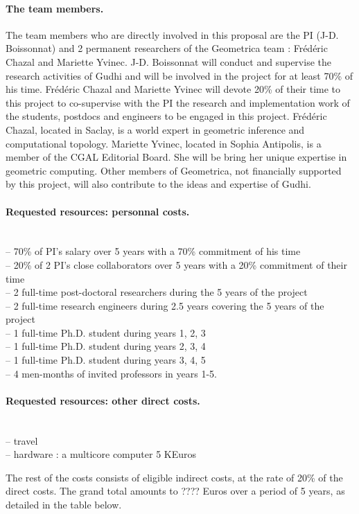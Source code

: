 \paragraph{The team members.}
The team members who are directly involved in this proposal are the PI (J-D. Boissonnat) and 2 permanent researchers of the Geometrica team : Fr\'ed\'eric Chazal and Mariette Yvinec.  J-D. Boissonnat will conduct and supervise the research activities of Gudhi and will be involved in the project for at least 70\% of his time.  Fr\'ed\'eric Chazal and Mariette Yvinec will devote 20\% of their time to this project to co-supervise with the PI the research and implementation work of the students, postdocs and engineers to be engaged in this project. Fr\'ed\'eric Chazal, located in Saclay,  is a world expert in geometric inference and computational topology. Mariette Yvinec, located in Sophia Antipolis,  is a member of the CGAL Editorial Board. She  will be bring her unique expertise in geometric computing. Other members of Geometrica, not financially supported by this project, will also contribute to the ideas and expertise of Gudhi.


\paragraph{Requested resources: personnal costs.}\mbox{}\\
-- 70\% of PI's salary over 5 years with a 70\% commitment of his time\\
-- 20\% of 2 PI's close collaborators over 5 years with a 20\% commitment of their time\\
-- 2 full-time post-doctoral researchers during the 5 years of the project\\
-- 2 full-time research engineers during 2.5 years covering the 5 years of the project\\
-- 1 full-time Ph.D. student during years 1, 2, 3\\
-- 1 full-time Ph.D. student during years 2, 3, 4\\
-- 1 full-time Ph.D. student during years 3, 4, 5\\
-- 4 men-months of invited professors in years 1-5.

\paragraph{Requested resources: other direct costs.}\mbox{}\\
-- travel \\
-- hardware : a multicore computer 5 KEuros

The rest of the costs consists of eligible indirect costs, at the rate of 20\% of the direct costs. 
The grand total amounts to ???? Euros over a period of 5 years, as detailed in the table below.



